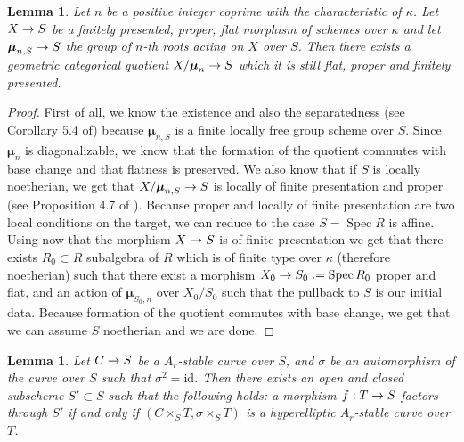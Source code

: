 \documentclass{alggeom}
\numberwithin{equation}{section}
\numberwithin{subsection}{section}
\newtheorem{lemma}[theorem]{Lemma}
\theoremstyle{definition}
\theoremstyle{remark}
\newcommand\arr{\ifinner\to\else\longrightarrow\fi}
\newcommand\spec{\operatorname{Spec}}
\newcommand\id{\mathrm{id}}
\newcommand{\mmu}{\boldsymbol{\mu}}
\begin{document}
\begin{lemma}\label{lem:quotient}
	Let $n$ be a positive integer coprime with the characteristic of $\kappa$.
	Let $X\arr S$ be a finitely presented, proper, flat morphism of schemes over $\kappa$ and let $\mmu_{n,S}\arr S$ the group of $n$-th roots acting on $X$ over $S$. Then there exists a geometric categorical quotient $X/\mmu_n\arr S$ which it is still  flat, proper and finitely presented.  
\end{lemma}
\begin{proof}
First of all, we know the existence and also the separatedness (see Corollary 5.4 of\cite{Rydh}) because $\mmu_{n,S}$ is a finite locally free group scheme over $S$. Since $\mmu_{n}$ is diagonalizable, we know that the formation of the quotient commutes with base change and that flatness is preserved. We also know that if $S$ is locally noetherian, we get that $X/\mmu_{n,S} \arr S$ is locally of finite presentation and proper (see Proposition 4.7 of \cite{Rydh}). Because proper and locally of finite presentation are two local conditions on the target, we can reduce to the case $S=\spec R$ is affine. Using now that the morphism $X\arr S$ is of finite presentation we get that there exists $R_0 \subset R$ subalgebra of $R$ which is of finite type over $\kappa$ (therefore noetherian) such that there exist a morphism $X_0\arr S_0:=\spec R_0$ proper and flat, and an action of $\mmu_{S_0,n}$ over $X_0/S_0$ such that the pullback to $S$ is our initial data. Because formation of the quotient commutes with base change, we get that we can assume $S$ noetherian and we are done.
\end{proof}

\begin{lemma}\label{lem:conn-comp}
	Let $C\arr S$ be a $A_r$-stable curve over $S$, and $\sigma$ be an automorphism of the curve over $S$ such that $\sigma^2=\id$. Then there exists an open and closed subscheme $S'\subset S$ such that the following holds: a morphism $f:T\arr S$  factors through $S'$ if and only if $(C\times_S T, \sigma \times_S T)$ is a hyperelliptic $A_r$-stable curve over $T$.
\end{lemma}
  
\end{document}
